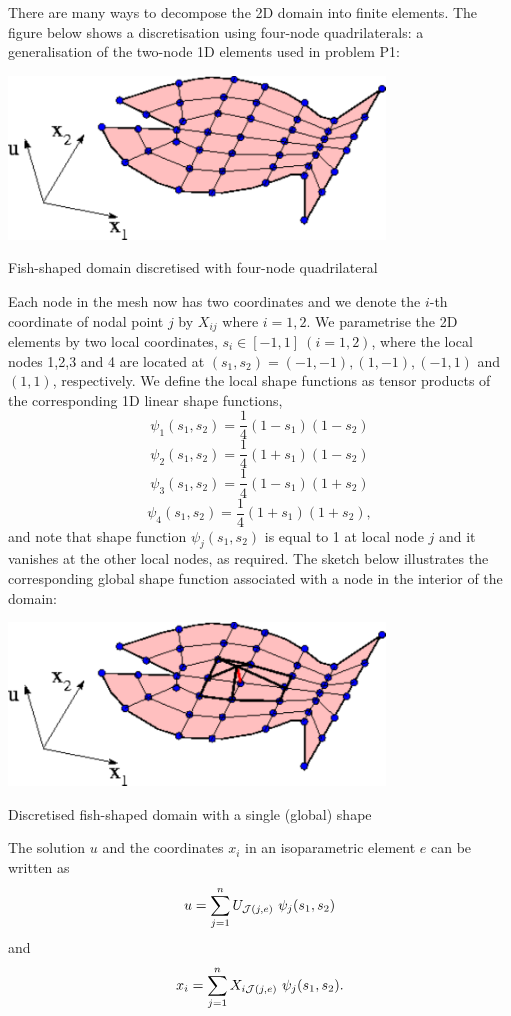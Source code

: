 There are many ways to decompose the 2\-D domain into finite elements. The figure below shows a discretisation using four-\/node quadrilaterals\-: a generalisation of the two-\/node 1\-D elements used in problem P1\-:  
\begin{DoxyImage}
\includegraphics[width=0.75\textwidth]{fish_domain_with_mesh}
\caption{Fish-\/shaped domain discretised with four-\/node quadrilateral }
\end{DoxyImage}
 Each node in the mesh now has two coordinates and we denote the $i$-\/th coordinate of nodal point $j$ by $ X_{ij}$ where $ i=1,2 $. We parametrise the 2\-D elements by two local coordinates, $ s_i \in [-1,1] \ (i=1,2)$, where the local nodes 1,2,3 and 4 are located at $(s_1,s_2)=(-1,-1), (1,-1), (-1,1)$ and $(1,1)$, respectively. We define the local shape functions as tensor products of the corresponding 1\-D linear shape functions, \[ \psi_1(s_1,s_2) = \frac{1}{4}(1-s_1)(1-s_2) \] \[ \psi_2(s_1,s_2) = \frac{1}{4}(1+s_1)(1-s_2) \] \[ \psi_3(s_1,s_2) = \frac{1}{4}(1-s_1)(1+s_2) \] \[ \psi_4(s_1,s_2) = \frac{1}{4}(1+s_1)(1+s_2), \] and note that shape function $ \psi_j(s_1,s_2)$ is equal to 1 at local node $j$ and it vanishes at the other local nodes, as required. The sketch below illustrates the corresponding global shape function associated with a node in the interior of the domain\-:  
\begin{DoxyImage}
\includegraphics[width=0.75\textwidth]{fish_domain_with_shape_fct}
\caption{Discretised fish-\/shaped domain with a single (global) shape }
\end{DoxyImage}
 The solution $u$ and the coordinates $x_i$ in an isoparametric element $e$ can be written as \[ u = \sum_{j=1}^n U_{{\cal J}(j,e)} \ \psi_j(s_1,s_2) \] and \[ x_i = \sum_{j=1}^n X_{i{\cal J}(j,e)} \ \psi_j(s_1,s_2). \]

